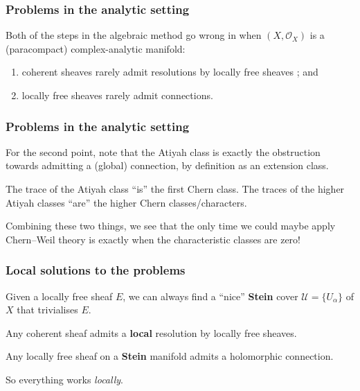 \documentclass{beamer}
\begin{document}
  \begin{frame}\frametitle{Problems in the analytic setting}
    Both of the steps in the algebraic method go wrong in when $(X,\mathcal{O}_X)$ is a (paracompact) complex-analytic manifold:
    \begin{enumerate}
      \item coherent sheaves rarely admit resolutions by locally free sheaves ; and
      \item locally free sheaves rarely admit connections.
    \end{enumerate}
  \end{frame}

  \begin{frame}\frametitle{Problems in the analytic setting}
    For the second point, note that the Atiyah class is exactly the obstruction towards admitting a (global) connection, by definition as an extension class.

    \pause

    \begin{lemma}
      The trace of the Atiyah class ``is'' the first Chern class.
      The traces of the higher Atiyah classes ``are'' the higher Chern classes/characters.
    \end{lemma}

    \pause

    Combining these two things, we see that the only time we could maybe apply Chern--Weil theory is exactly when the characteristic classes are zero!
  \end{frame}

  \begin{frame}\frametitle{Local solutions to the problems}

    \begin{lemma}
      Given a locally free sheaf $E$, we can always find a ``nice'' \textbf{Stein} cover $\mathscr{U}=\{U_\alpha\}$ of $X$ that trivialises $E$.
    \end{lemma}

    \pause

    \begin{lemma}
      Any coherent sheaf admits a \textbf{local} resolution by locally free sheaves.
    \end{lemma}

    \pause

    \begin{lemma}
      Any locally free sheaf on a \textbf{Stein} manifold admits a holomorphic connection.
    \end{lemma}

    \pause

    So everything works \emph{locally}.
  \end{frame}
\end{document}
